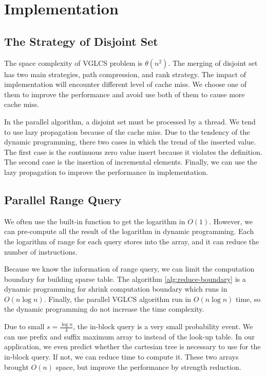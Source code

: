 \section{Implementation}
\label{sec:Implementation}

\subsection{The Strategy of Disjoint Set}

The space complexity of VGLCS problem is $\theta(n^2)$.  The merging
of disjoint set has two main strategies, path compression, and rank
strategy.  The impact of implementation will encounter different level
of cache miss.  We choose one of them to improve the performance and
avoid use both of them to cause more cache miss.

In the parallel algorithm, a disjoint set must be processed by a
thread.  We tend to use lazy propagation because of the cache miss.
Due to the tendency of the dynamic programming, there two cases in
which the trend of the inserted value.  The first case is the
continuous zero value insert because it violates the definition.  The
second case is the insertion of incremental elements.  Finally, we can
use the lazy propagation to improve the performance in implementation.

\subsection{Parallel Range Query}

We often use the built-in function to get the logarithm in $O(1)$.
However, we can pre-compute all the result of the logarithm in dynamic
programming.  Each the logarithm of range for each query stores into
the array, and it can reduce the number of instructions.

Because we know the information of range query, we can limit the
computation boundary for building sparse table.  The algorithm
\ref{alg:reduce-boundary} is a dynamic programming for shrink
computation boundary which runs in $O(n \log n)$.  Finally, the
parallel VGLCS algorithm run in $O(n \log n)$ time, so the dynamic
programming do not increase the time complexity.



Due to small $s = \frac{\log n}{4}$, the in-block query is a very
small probability event.  We can use prefix and suffix maximum array
to instead of the look-up table.  In our application, we even predict
whether the cartesian tree is necessary to use for the in-block query.
If not, we can reduce time to compute it.  These two arrays brought
$O(n)$ space, but improve the performance by strength reduction.
